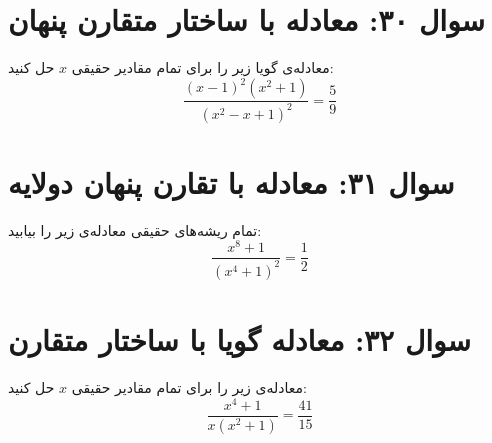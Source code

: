 \documentclass[12pt]{article}
\begin{document}
	\vspace{1cm}
	\hrulefill
	\vspace{1cm}
	
	\section*{سوال ۳۰: معادله با ساختار متقارن پنهان}
	معادله‌ی گویا زیر را برای تمام مقادیر حقیقی \(x\) حل کنید:
	\begin{displaymath}
		\frac{(x-1)^2 (x^2+1)}{(x^2-x+1)^2} = \frac{5}{9}
	\end{displaymath}
	
	\vspace{1cm}
	\hrulefill
	\vspace{1cm}
	
	
	\section*{سوال ۳۱: معادله با تقارن پنهان دولایه}
	تمام ریشه‌های حقیقی معادله‌ی زیر را بیابید:
	\begin{displaymath}
		\frac{x^8 + 1}{(x^4 + 1)^2} = \frac{1}{2}
	\end{displaymath}
	
	\vspace{1cm}
	\hrulefill
	\vspace{1cm}
	
	\section*{سوال ۳۲: معادله گویا با ساختار متقارن}
	معادله‌ی زیر را برای تمام مقادیر حقیقی \(x\) حل کنید:
	\begin{displaymath}
		\frac{x^4 + 1}{x(x^2 + 1)} = \frac{41}{15}
	\end{displaymath}
	
	\vspace{1cm}
	\hrulefill
	\vspace{1cm}
	
\end{document}
